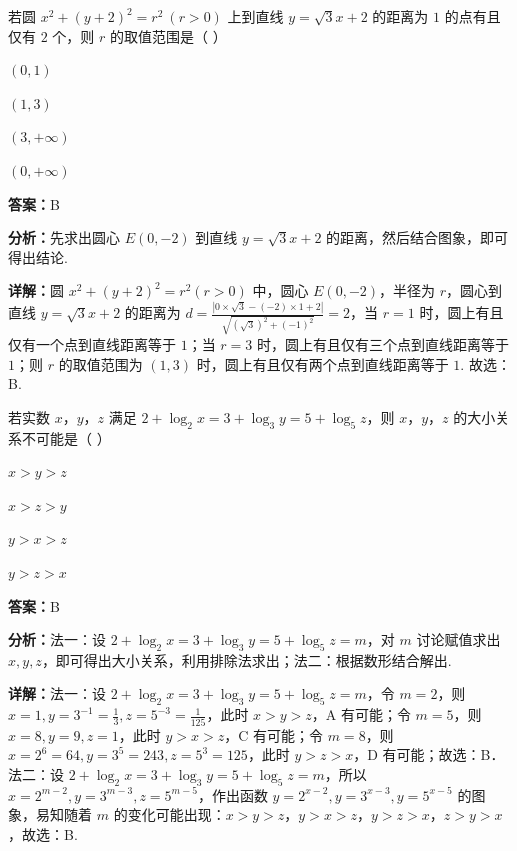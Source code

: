 \begin{question}[points=5]
若圆 $x^2 + (y+2)^2 = r^2 \ (r>0)$ 上到直线 $y = \sqrt{3}x+2$ 的距离为 $1$ 的点有且仅有 $2$ 个，则 $r$ 的取值范围是（ ）
\begin{choices}
  \item $(0,1)$
  \item $(1,3)$
  \item $(3,+\infty)$
  \item $(0,+\infty)$
\end{choices}
\begin{solution}
\textbf{答案：}B

\textbf{分析：}先求出圆心 $E(0,-2)$ 到直线 $y = \sqrt{3}x+2$ 的距离，然后结合图象，即可得出结论.

\textbf{详解：}圆 $x^2+(y+2)^2=r^2(r>0)$ 中，圆心 $E(0,-2)$，半径为 $r$，圆心到直线 $y = \sqrt{3}x+2$ 的距离为 $d = \frac{|0\times\sqrt{3} - (-2)\times1 + 2|}{\sqrt{(\sqrt{3})^2+(-1)^2}} = 2$，当 $r=1$ 时，圆上有且仅有一个点到直线距离等于 $1$；当 $r=3$ 时，圆上有且仅有三个点到直线距离等于 $1$；则 $r$ 的取值范围为 $(1,3)$ 时，圆上有且仅有两个点到直线距离等于 $1$. 故选：B.
\end{solution}
\end{question}

\begin{question}[points=5]
若实数 $x$，$y$，$z$ 满足 $2 + \log_2 x = 3 + \log_3 y = 5 + \log_5 z$，则 $x$，$y$，$z$ 的大小关系不可能是（ ）
\begin{choices}
  \item $x > y > z$
  \item $x > z > y$
  \item $y > x > z$
  \item $y > z > x$
\end{choices}
\begin{solution}
\textbf{答案：}B

\textbf{分析：}法一：设 $2+\log_2 x = 3+\log_3 y = 5+\log_5 z = m$，对 $m$ 讨论赋值求出 $x,y,z$，即可得出大小关系，利用排除法求出；法二：根据数形结合解出.

\textbf{详解：}法一：设 $2+\log_2 x = 3+\log_3 y = 5+\log_5 z = m$，令 $m=2$，则 $x=1,y=3^{-1}=\frac{1}{3},z=5^{-3}=\frac{1}{125}$，此时 $x>y>z$，A 有可能；令 $m=5$，则 $x=8,y=9,z=1$，此时 $y>x>z$，C 有可能；令 $m=8$，则 $x=2^6=64,y=3^5=243,z=5^3=125$，此时 $y>z>x$，D 有可能；故选：B．法二：设 $2+\log_2 x = 3+\log_3 y = 5+\log_5 z = m$，所以 $x=2^{m-2}, y=3^{m-3}, z=5^{m-5}$，作出函数 $y=2^{x-2}, y=3^{x-3}, y=5^{x-5}$ 的图象，易知随着 $m$ 的变化可能出现：$x>y>z$，$y>x>z$，$y>z>x$，$z>y>x$，故选：B.
\end{solution}
\end{question}

